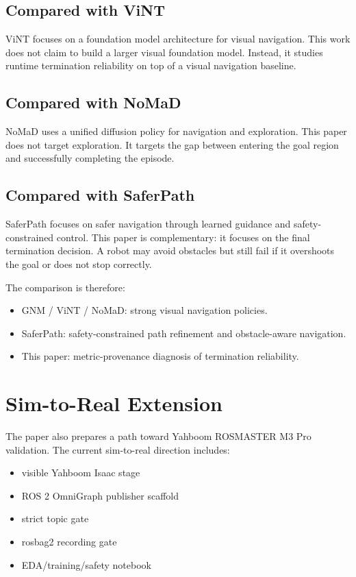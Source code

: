 \documentclass[conference]{IEEEtran}
\begin{document}
\subsection{Compared with ViNT}
ViNT focuses on a foundation model architecture for visual navigation. This work does not claim to build a larger visual foundation model. Instead, it studies runtime termination reliability on top of a visual navigation baseline.

\subsection{Compared with NoMaD}
NoMaD uses a unified diffusion policy for navigation and exploration. This paper does not target exploration. It targets the gap between entering the goal region and successfully completing the episode.

\subsection{Compared with SaferPath}
SaferPath focuses on safer navigation through learned guidance and safety-constrained control. This paper is complementary: it focuses on the final termination decision. A robot may avoid obstacles but still fail if it overshoots the goal or does not stop correctly.

The comparison is therefore:
\begin{itemize}
    \item GNM / ViNT / NoMaD: strong visual navigation policies.
    \item SaferPath: safety-constrained path refinement and obstacle-aware navigation.
    \item This paper: metric-provenance diagnosis of termination reliability.
\end{itemize}

\section{Sim-to-Real Extension}

The paper also prepares a path toward Yahboom ROSMASTER M3 Pro validation. The current sim-to-real direction includes:
\begin{itemize}
    \item visible Yahboom Isaac stage
    \item ROS 2 OmniGraph publisher scaffold
    \item strict topic gate
    \item rosbag2 recording gate
    \item EDA/training/safety notebook
\end{itemize}
\end{document}
